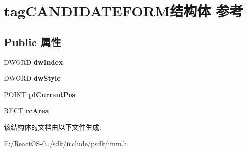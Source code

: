 \hypertarget{structtag_c_a_n_d_i_d_a_t_e_f_o_r_m}{}\section{tag\+C\+A\+N\+D\+I\+D\+A\+T\+E\+F\+O\+R\+M结构体 参考}
\label{structtag_c_a_n_d_i_d_a_t_e_f_o_r_m}
\subsection*{Public 属性}
\begin{DoxyCompactItemize}
\item 
\mbox{\label{structtag_c_a_n_d_i_d_a_t_e_f_o_r_m_a08edc904fb176934647f6e3cf2e0ed8b}} 
D\+W\+O\+RD {\bfseries dw\+Index}
\item 
\mbox{\label{structtag_c_a_n_d_i_d_a_t_e_f_o_r_m_ac9f3123e53f8f2a2b01f3598b83d5763}} 
D\+W\+O\+RD {\bfseries dw\+Style}
\item 
\mbox{\label{structtag_c_a_n_d_i_d_a_t_e_f_o_r_m_af3c44923942cd7e154d3bb30bf2e21fb}} 
\hyperlink{structtag_p_o_i_n_t}{P\+O\+I\+NT} {\bfseries pt\+Current\+Pos}
\item 
\mbox{\label{structtag_c_a_n_d_i_d_a_t_e_f_o_r_m_a090d6a39dafdfd7000f1b02aa341b8bc}} 
\hyperlink{structtag_r_e_c_t}{R\+E\+CT} {\bfseries rc\+Area}
\end{DoxyCompactItemize}


该结构体的文档由以下文件生成\+:\begin{DoxyCompactItemize}
\item 
E\+:/\+React\+O\+S-\/0../sdk/include/psdk/imm.\+h\end{DoxyCompactItemize}
